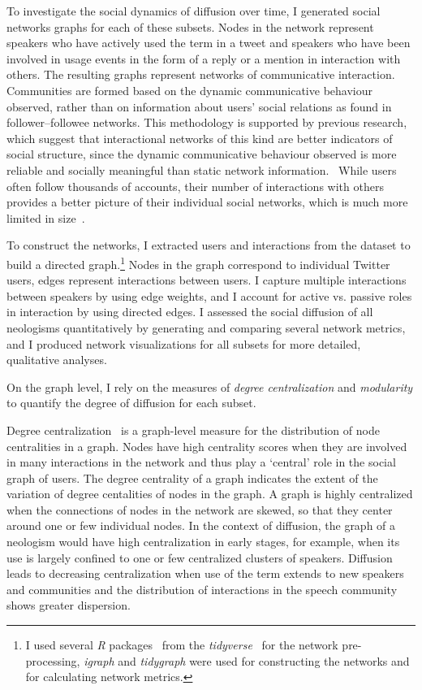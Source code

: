 \documentclass[
  a4paper,
  abstract=on,
  captions=tableabove
  ]{scrartcl}
\begin{document}
  To investigate the social dynamics of diffusion over time, I generated social networks graphs for each of these subsets. Nodes in the network represent speakers who have actively used the term in a tweet and speakers who have been involved in usage events in the form of a reply or a mention in interaction with others. The resulting graphs represent networks of communicative interaction. Communities are formed based on the dynamic communicative behaviour observed, rather than on information about users' social relations as found in follower--followee networks. This methodology is supported by previous research, which suggest that interactional networks of this kind are better indicators of social structure, since the dynamic communicative behaviour observed is more reliable and socially meaningful than static network information.~\parencite{Goel2016SocialDynamics, Huberman2008SocialNetworks} While users often follow thousands of accounts, their number of interactions with others provides a better picture of their individual social networks, which is much more limited in size~\parencite{Dunbar1992NeocortexSize}.

  To construct the networks, I extracted users and interactions from the dataset to build a directed graph.\footnote{I used several \emph{R} packages~\parencite{RCoreTeam2018LanguageEnvironment} from the \emph{tidyverse}~\parencite{Wickham2019WelcomeTidyverse} for the network pre-processing, \emph{igraph} and \emph{tidygraph} were used for constructing the networks and for calculating network metrics.} Nodes in the graph correspond to individual Twitter users, edges represent interactions between users. I capture multiple interactions between speakers by using edge weights, and I account for active vs. passive roles in interaction by using directed edges. I assessed the social diffusion of all neologisms quantitatively by generating and comparing several network metrics, and I produced network visualizations for all subsets for more detailed, qualitative analyses.

  On the graph level, I rely on the measures of \emph{degree centralization} and \emph{modularity} to quantify the degree of diffusion for each subset.

  Degree centralization~\parencite{Freeman1978CentralitySocial} is a graph-level measure for the distribution of node centralities in a graph. Nodes have high centrality scores when they are involved in many interactions in the network and thus play a `central' role in the social graph of users. The degree centrality of a graph indicates the extent of the variation of degree centalities of nodes in the graph. A graph is highly centralized when the connections of nodes in the network are skewed, so that they center around one or few individual nodes. In the context of diffusion, the graph of a neologism would have high centralization in early stages, for example, when its use is largely confined to one or few centralized clusters of speakers. Diffusion leads to decreasing centralization when use of the term extends to new speakers and communities and the distribution of interactions in the speech community shows greater dispersion.
\end{document}
